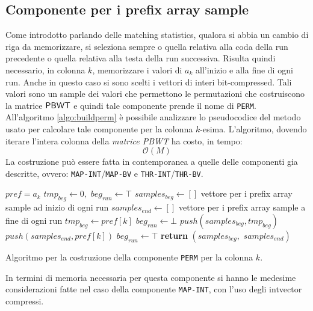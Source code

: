 \subsection{Componente per i prefix array sample}
Come introdotto parlando delle matching statistics, qualora si abbia un
cambio di riga da memorizzare, si seleziona sempre o quella relativa alla coda
della run precedente o quella relativa alla testa della run successiva. Risulta
quindi necessario, in colonna $k$, memorizzare i valori di $a_k$ all'inizio e
alla fine di ogni run. Anche in questo caso si sono scelti i vettori di interi
bit-compressed. Tali valori sono un sample dei valori che permettono
le permutazioni che costruiscono la matrice $\mbox{\rm {\sf PBWT}}$ e quindi tale
componente prende il nome di \texttt{PERM}.\\
All'algoritmo \ref{algo:buildperm} è possibile analizzare lo pseudocodice del
metodo usato per calcolare tale componente per la colonna
$k$-esima. L'algoritmo, dovendo iterare l'intera colonna della \textit{matrice
  PBWT} ha costo, in tempo:
\begin{equation}
  \label{eq:timeperm}
  \mathcal{O}(M)
\end{equation}
La costruzione può essere fatta in contemporanea a quelle delle componenti gia
descritte, ovvero: 
\texttt{MAP-INT}/\texttt{MAP-BV} e \texttt{THR-INT}/\texttt{THR-BV}.
\begin{algorithm}
  \small
  \begin{algorithmic}[1]
    \Comment $pref = a_k$
    \State $tmp_{beg}\gets 0,\,\,beg_{run}\gets \top$
    \State $samples_{beg} \gets []$
    \Comment vettore per i prefix array sample ad inizio di ogni run
    \State $samples_{end}\gets []$
    \Comment vettore per i prefix array sample a fine di ogni run
    \For {\textit{every} $k\in\left[0,\,\, height\right)$}
    \State $tmp_{beg}\gets pref[k]$
    \State $beg_{run}\gets \bot$
    \EndIf
    \State $push(samples_{beg}, tmp_{beg})$
    \State $push(samples_{end}, pref[k])$
    \State $beg_{run}\gets \top$
    \EndIf
    \EndFor
    \State \textbf{return} $(samples_{beg},\,\, samples_{end})$  
    \EndFunction
  \end{algorithmic}
  \caption{{\footnotesize{Algoritmo per la costruzione della componente
  \texttt{PERM} per la colonna $k$.}}}
  \label{algo:buildperm}
\end{algorithm}
\noindent
In termini di memoria necessaria per questa componente si hanno le medesime
considerazioni fatte nel caso della componente \texttt{MAP-INT}, con l'uso degli
intvector compressi.